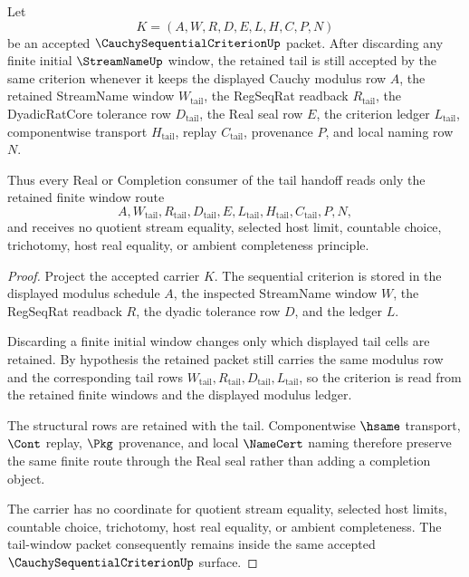 \begin{theorem}\label{thm:cauchy-sequential-criterion-tail-window-stability}
Let
$$
K=(A,W,R,D,E,L,H,C,P,N)
$$
be an accepted $\CauchySequentialCriterionUp$ packet. After discarding any finite initial $\StreamNameUp$ window, the retained tail is still accepted by the same criterion whenever it keeps the displayed Cauchy modulus row $A$, the retained StreamName window $W_{\mathrm{tail}}$, the RegSeqRat readback $R_{\mathrm{tail}}$, the DyadicRatCore tolerance row $D_{\mathrm{tail}}$, the Real seal row $E$, the criterion ledger $L_{\mathrm{tail}}$, componentwise transport $H_{\mathrm{tail}}$, replay $C_{\mathrm{tail}}$, provenance $P$, and local naming row $N$.

Thus every Real or Completion consumer of the tail handoff reads only the retained finite window route
$$
A,W_{\mathrm{tail}},R_{\mathrm{tail}},D_{\mathrm{tail}},E,L_{\mathrm{tail}},H_{\mathrm{tail}},C_{\mathrm{tail}},P,N,
$$
and receives no quotient stream equality, selected host limit, countable choice, trichotomy, host real equality, or ambient completeness principle.
\end{theorem}
\begin{proof}
Project the accepted carrier $K$. The sequential criterion is stored in the displayed modulus schedule $A$, the inspected StreamName window $W$, the RegSeqRat readback $R$, the dyadic tolerance row $D$, and the ledger $L$.

Discarding a finite initial window changes only which displayed tail cells are retained. By hypothesis the retained packet still carries the same modulus row and the corresponding tail rows $W_{\mathrm{tail}},R_{\mathrm{tail}},D_{\mathrm{tail}},L_{\mathrm{tail}}$, so the criterion is read from the retained finite windows and the displayed modulus ledger.

The structural rows are retained with the tail. Componentwise $\hsame$ transport, $\Cont$ replay, $\Pkg$ provenance, and local $\NameCert$ naming therefore preserve the same finite route through the Real seal rather than adding a completion object.

The carrier has no coordinate for quotient stream equality, selected host limits, countable choice, trichotomy, host real equality, or ambient completeness. The tail-window packet consequently remains inside the same accepted $\CauchySequentialCriterionUp$ surface.
\end{proof}

